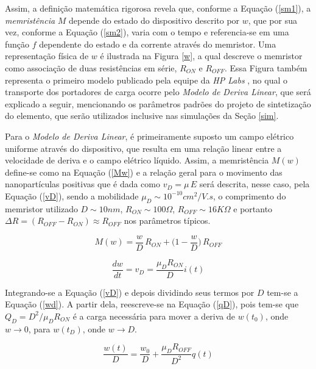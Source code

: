 \documentclass{ceel}
\begin{document}
\begin{multicols}{2}
Assim, a definição matemática rigorosa revela que, conforme a Equação (\ref{sm1}), a \emph{memristência} $M$ depende do estado do dispositivo descrito por $w$, que por sua vez, conforme a Equação (\ref{sm2}), varia com o tempo e referencia-se em uma função $f$ dependente do estado e da corrente através do memristor. Uma representação física de $w$ é ilustrada na Figura \ref{w}, a qual descreve o memristor como associação de duas resistências em série, $R_{ON}$ e $R_{OFF}$. Essa Figura também representa o primeiro modelo publicado pela equipe da \emph{HP Labs} \cite{nature}, no qual o transporte dos portadores de carga ocorre pelo \emph{Modelo de Deriva Linear}, que será explicado a seguir, mencionando os parâmetros padrões do projeto de sintetização do elemento, que serão utilizados inclusive nas simulações da Seção \ref{sim}.

Para o \emph{Modelo de Deriva Linear}, é primeiramente suposto um campo elétrico uniforme através do dispositivo, que resulta em uma relação linear entre a velocidade de deriva e o campo elétrico líquido. Assim, a memristência $M(w)$ define-se como na Equação (\ref{Mw}) e a relação geral para o movimento das nanopartículas positivas que é dada como $v_D=\mu\, E$ será descrita, nesse caso, pela Equação (\ref{vD}), sendo a mobilidade $\mu_D \sim 10^{-10} cm^2/V.s$, o comprimento do memristor utilizado $D\sim10nm$, $R_{ON}\sim 100\Omega$, $R_{OFF}\sim 16K\Omega$ e portanto $\Delta R = (R_{OFF} - R_{ON}) \approx R_{OFF}$ nos parâmetros típicos.
\columnbreak

\begin{equation}\label{Mw}
M(w)=\dfrac{w}{D}\, R_{ON}+\Big(1 - \dfrac{w}{D}\Big)\, R_{OFF}
\end{equation}

\begin{equation}\label{vD}
\dfrac{dw}{dt}=v_D=\dfrac{\mu_D R_{ON}}{D}i(t)
\end{equation}
\vspace{0.05cm}

Integrando-se a Equação (\ref{vD}) e depois dividindo seus termos por $D$ tem-se a Equação (\ref{wd}).
A partir dela, reescreve-se na Equação (\ref{qD}), pois tem-se que $Q_D=D^2/\mu_D R_{ON}$ é a carga necessária para mover a deriva de $w(t_0)$, onde $w\rightarrow 0$, para $w(t_D)$, onde $w\rightarrow D$.

\begin{equation}\label{wd}
\dfrac{w(t)}{D}=\dfrac{w_0}{D}+\dfrac{\mu_D R_{OFF}}{D^2}q(t)
\end{equation}


\end{multicols}
\end{document}
